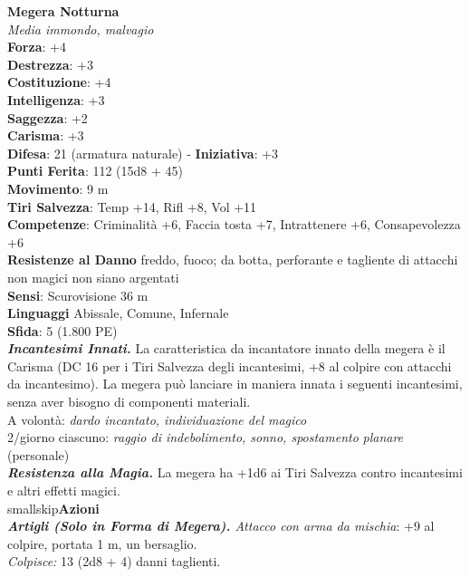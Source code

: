 \begin{multicols}{2}
\medskip\textbf{Megera Notturna}\\
\emph{Media immondo, malvagio}\\
\textbf{Forza}: +4\\
\textbf{Destrezza}: +3\\
\textbf{Costituzione}: +4\\
\textbf{Intelligenza}: +3\\
\textbf{Saggezza}: +2\\
\textbf{Carisma}: +3\\
\textbf{Difesa}: 21 (armatura naturale) - \textbf{Iniziativa}: +3\\
\textbf{Punti Ferita}: 112 (15d8 + 45)\\
\textbf{Movimento}: 9 m\\
\textbf{Tiri Salvezza}: Temp +14, Rifl +8, Vol +11\\
\textbf{Competenze}: Criminalità +6, Faccia tosta +7, Intrattenere +6, Consapevolezza +6\\
\textbf{Resistenze al Danno} freddo, fuoco; da botta, perforante e tagliente di attacchi non magici non siano argentati\\
\textbf{Sensi}: Scurovisione 36 m\\
\textbf{Linguaggi} Abissale, Comune, Infernale\\
\textbf{Sfida}: 5 (1.800 PE)\smallskip\\

\emph{\textbf{Incantesimi Innati.}} La caratteristica da incantatore innato della megera è il Carisma (DC  16 per i Tiri Salvezza degli incantesimi, +8 al colpire con attacchi da incantesimo). La megera può lanciare in maniera innata i seguenti incantesimi, senza aver bisogno di componenti materiali.\\

A volontà: \emph{dardo incantato, individuazione del magico}\\
2/giorno ciascuno: \emph{raggio di indebolimento, sonno, spostamento} \emph{planare} (personale)\\
\emph{\textbf{Resistenza alla Magia.}} La megera ha +1d6 ai Tiri Salvezza contro incantesimi e altri effetti magici.\\
smallskip\textbf{Azioni}\\
\emph{\textbf{Artigli (Solo in Forma di Megera).} Attacco con arma da mischia}: +9 al colpire, portata 1 m, un bersaglio.\\
\emph{Colpisce:} 13 (2d8 + 4) danni taglienti.\\


\end{multicols}
